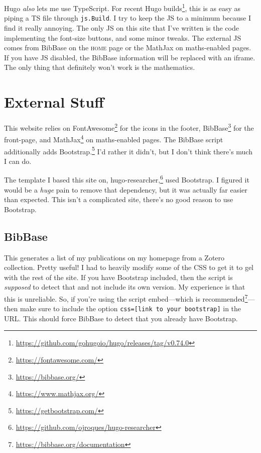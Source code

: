 \documentclass[a4paper,11pt,oneside,article]{memoir}
\begin{document}
Hugo \emph{also} lets me use TypeScript. For recent Hugo builds\footnote{\url{https://github.com/gohugoio/hugo/releases/tag/v0.74.0}}, this is as easy as piping a TS file through \texttt{js.Build}. I try to keep the JS to a minimum because I find it really annoying. The only JS on this site that I've written is the code implementing the font-size buttons, and some minor tweaks. The external JS comes from BibBase on the \textsc{home} page or the MathJax on maths-enabled pages. If you have JS disabled, the BibBase information will be replaced with an iframe. The only thing that definitely won't work is the mathematics.

\chapter[External Stuff]{External Stuff}

This website relies on FontAwesome\footnote{\url{https://fontawesome.com/}} for the icons in the footer, BibBase\footnote{\url{https://bibbase.org/}} for the front-page, and MathJax\footnote{\url{https://www.mathjax.org/}} on maths-enabled pages. The BibBase script additionally adds Bootstrap.\footnote{\url{https://getbootstrap.com/}} I'd rather it didn't, but I don't think there's much I can do.

The template I based this site on, hugo-researcher,\footnote{\url{https://github.com/ojroques/hugo-researcher}} used Bootstrap. I figured it would be a \emph{huge} pain to remove that dependency, but it was actually far easier than expected. This isn't a complicated site, there's no good reason to use Bootstrap.

\section{BibBase}

This generates a list of my publications on my homepage from a Zotero collection. Pretty useful! I had to heavily modify some of the CSS to get it to gel with the rest of the site.  If you have Bootstrap included, then the script is \emph{supposed} to detect that and not include its own version. My experience is that this is unreliable. So, if you're using the script embed—which is recommended\footnote{\url{https://bibbase.org/documentation}}—then make sure to include the option \texttt{css=[link to your bootstrap]} in the URL. This should force BibBase to detect that you already have Bootstrap.
\end{document}
